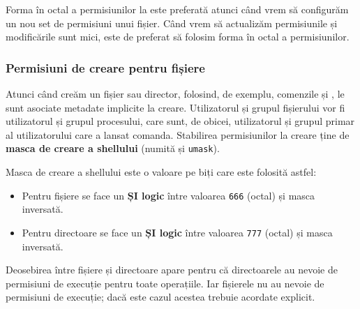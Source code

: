 
Forma în octal a permisiunilor la  este preferată atunci când vrem să
configurăm un nou set de permisiuni unui fișier. Când vrem să actualizăm
permisiunile și modificările sunt mici, este de preferat să folosim forma în
octal a permisiunilor.

\subsubsection{Permisiuni de creare pentru fișiere}
\label{sec:user:umask}

Atunci când creăm un fișier sau director, folosind, de exemplu, comenzile 
și , le sunt asociate metadate implicite la creare. Utilizatorul și grupul
fișierului vor fi utilizatorul și grupul procesului, care sunt, de obicei,
utilizatorul și grupul primar al utilizatorului care a lansat comanda.
Stabilirea permisiunilor la creare ține de \textbf{masca de creare a shellului} (numită și \texttt{umask}).

Masca de creare a shellului este o valoare pe biți care este folosită astfel:

\begin{itemize}
  \item Pentru fișiere se face un \textbf{ȘI logic} între valoarea \texttt{666} (octal) și
    masca inversată.
  \item Pentru directoare se face un \textbf{ȘI logic} între valoarea \texttt{777} (octal)
    și masca inversată.
\end{itemize}

Deosebirea între fișiere și directoare apare pentru că directoarele au nevoie de permisiuni de execuție pentru
toate operațiile. Iar fișierele nu au nevoie de permisiuni de execuție; dacă
este cazul acestea trebuie acordate explicit.

